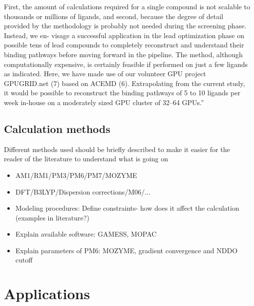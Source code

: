 \begin{itemize}
{First, the amount of calculations required for a single compound is not scalable to thousands or millions of ligands, and second, because the degree of detail provided by the methodology is probably not needed during the screening phase.
Instead, we en- visage a successful application in the lead optimization phase on possible tens of lead compounds to completely reconstruct and understand their binding pathways before moving forward in the pipeline.
The method, although computationally expensive, is certainly feasible if performed on just a few ligands as indicated.
Here, we have made use of our volunteer GPU project GPUGRID.net (7) based on ACEMD (6).
Extrapolating from the current study, it would be possible to reconstruct the binding pathways of 5 to 10 ligands per week in-house on a moderately sized GPU cluster of 32–64 GPUs.}''\cite{buch2011complete}
\end{itemize}

\subsection{Calculation methods}
Different methods used should be briefly described to make it easier for the reader of the literature to understand what is going on
\begin{itemize}
\item AM1/RM1/PM3/PM6/PM7/MOZYME
\item DFT/B3LYP/Dispersion corrections/M06/...
\item Modeling procedures: Define constraints- how does it affect the calculation (examples in literature?)
\item Explain available software: GAMESS, MOPAC
\item Explain parameters of PM6: MOZYME, gradient convergence and NDDO cutoff
\end{itemize}


\section{Applications}\label{sec:apps}

